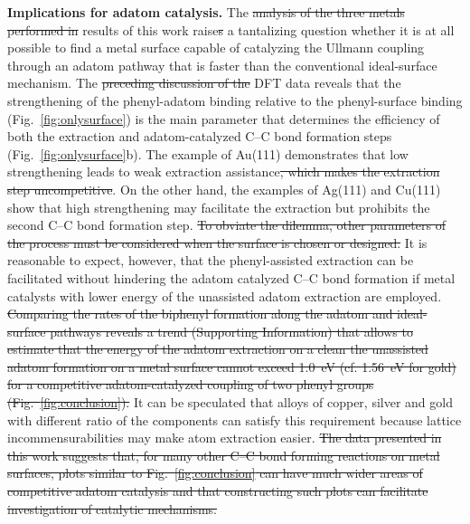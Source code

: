 \documentclass[aps,prb,amsmath,amssymb,11pt]{revtex4-1}
\newcommand{\sinfo}{Supporting Information}
\newcommand{\zhzh}{\color{blue}}
\begin{document}
\textbf{Implications for adatom catalysis.} 
%
The \sout{analysis of the three metals performed in} {\zhzh results of} this work raise\sout{s} a tantalizing question whether it is at all possible to find a metal surface capable of catalyzing the Ullmann coupling through an adatom pathway that is faster than the conventional ideal-surface mechanism. 
The \sout{preceding discussion of the} DFT data reveals that the strengthening of the phenyl-adatom binding relative to the phenyl-surface binding (Fig.~\ref{fig:onlysurface}) is the main parameter that determines the efficiency of both the extraction and adatom-catalyzed C--C bond formation steps (Fig.~\ref{fig:onlysurface}b).
The example of Au(111) demonstrates that low strengthening leads to weak extraction assistance\sout{, which makes the extraction step uncompetitive}. On the other hand, the examples of Ag(111) and Cu(111) show that high strengthening may facilitate the extraction but prohibits the second C--C bond formation step. 
%
\sout{To obviate the dilemma, other parameters of the process must be considered when the surface is chosen or designed.} It is reasonable to expect, however, that the phenyl-assisted extraction can be facilitated without hindering the adatom catalyzed C--C bond formation if metal catalysts with low{\zhzh er} energy of the unassisted adatom extraction are employed. 
%
\sout{Comparing the rates of the biphenyl formation along the adatom and ideal-surface pathways reveals a trend (\sinfo) that allows to estimate that the energy of \sout{the adatom extraction on a clean} {\zhzh the unassisted adatom formation on a} metal surface cannot exceed 1.0~eV (cf. 1.56~eV for gold) for a competitive adatom-catalyzed coupling of two phenyl groups (Fig.~\ref{fig:conclusion}).}
It can be speculated that alloys of copper, silver and gold with different ratio of the components can satisfy this requirement because lattice incommensurabilities may make atom extraction easier. 
%
%
\sout{The data presented in this work suggests that, for many other C--C bond forming reactions on metal surfaces, plots similar to Fig.~\ref{fig:conclusion} can have much wider areas of competitive adatom catalysis and that constructing such plots can facilitate investigation of catalytic mechanisms.}
\end{document}

